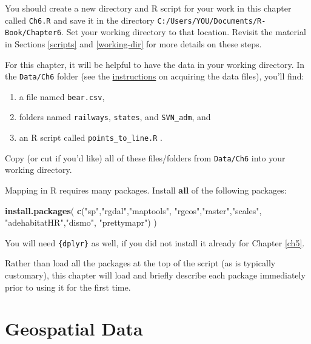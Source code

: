 \documentclass[]{book}
\newenvironment{Shaded}{\begin{snugshade}}{\end{snugshade}}
\newcommand{\KeywordTok}[1]{\textcolor[rgb]{0.13,0.29,0.53}{\textbf{#1}}}
\newcommand{\NormalTok}[1]{#1}
\newcommand{\StringTok}[1]{\textcolor[rgb]{0.31,0.60,0.02}{#1}}
\providecommand{\tightlist}{%
  \setlength{\itemsep}{0pt}\setlength{\parskip}{0pt}}
\begin{document}
You should create a new directory and R script for your work in this chapter called \texttt{Ch6.R} and save it in the directory \texttt{C:/Users/YOU/Documents/R-Book/Chapter6}. Set your working directory to that location. Revisit the material in Sections \ref{scripts} and \ref{working-dir} for more details on these steps.

For this chapter, it will be helpful to have the data in your working directory. In the \texttt{Data/Ch6} folder (see the \protect\hyperlink{data-sets}{instructions} on acquiring the data files), you'll find:

\begin{enumerate}
\def\labelenumi{\arabic{enumi}.}
\tightlist
\item
  a file named \texttt{bear.csv},
\item
  folders named \texttt{railways}, \texttt{states}, and \texttt{SVN\_adm}, and
\item
  an R script called \texttt{points\_to\_line.R} \citep{points-line-cite}.
\end{enumerate}

Copy (or cut if you'd like) all of these files/folders from \texttt{Data/Ch6} into your working directory.

Mapping in R requires many packages. Install \textbf{all} of the following packages:

\begin{Shaded}
\begin{Highlighting}[]
\KeywordTok{install.packages}\NormalTok{(}
  \KeywordTok{c}\NormalTok{(}\StringTok{"sp"}\NormalTok{,}\StringTok{"rgdal"}\NormalTok{,}\StringTok{"maptools"}\NormalTok{,}
  \StringTok{"rgeos"}\NormalTok{,}\StringTok{"raster"}\NormalTok{,}\StringTok{"scales"}\NormalTok{,}
  \StringTok{"adehabitatHR"}\NormalTok{,}\StringTok{"dismo"}\NormalTok{, }\StringTok{"prettymapr"}\NormalTok{)}
\NormalTok{)}
\end{Highlighting}
\end{Shaded}

You will need \texttt{\{dplyr\}} \citep{R-dplyr} as well, if you did not install it already for Chapter \ref{ch5}.

Rather than load all the packages at the top of the script (as is typically customary), this chapter will load and briefly describe each package immediately prior to using it for the first time.

\hypertarget{intro}{%
\section{Geospatial Data}\label{intro}}
\end{document}

